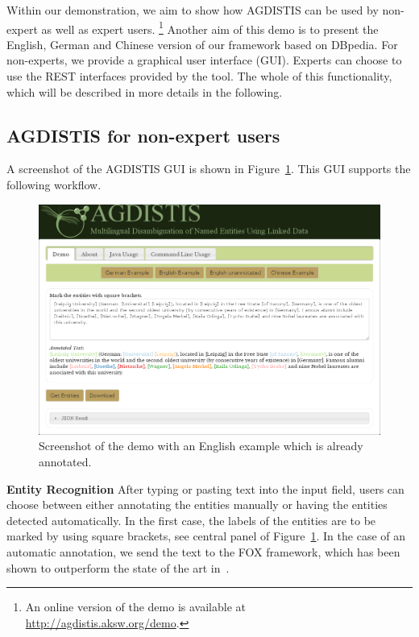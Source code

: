 Within our demonstration, we aim to show how AGDISTIS can be used by non-expert as well as expert users. \footnote{An online version of the demo is available at \url{http://agdistis.aksw.org/demo}.}
Another aim of this demo is to present the English, German and Chinese version of our framework based on DBpedia.
For non-experts, we provide a graphical user interface (GUI).
Experts can choose to use the REST interfaces provided by the tool. %
The whole of this functionality, which will be described in more details in the following. %

\subsection{AGDISTIS for non-expert users}
A screenshot of the AGDISTIS GUI is shown in Figure~\ref{fig:gui}.
This GUI supports the following workflow.

\begin{figure}[htb!]
\centering
\includegraphics[width=\textwidth]{part_02/unstructured_annotation/fig/GUI.png}
\caption{Screenshot of the demo with an English example which is already annotated.}
\label{fig:gui}
\end{figure}

\noindent\textbf{Entity Recognition}
After typing or pasting text into the input field, users can choose between either annotating the entities manually or having the entities detected automatically.
In the first case, the labels of the entities are to be marked by using square brackets, see central panel of Figure~\ref{fig:gui}.
In the case of an automatic annotation, we send the text to the FOX framework, which has been shown to outperform the state of the art in~\cite{FOX}.

